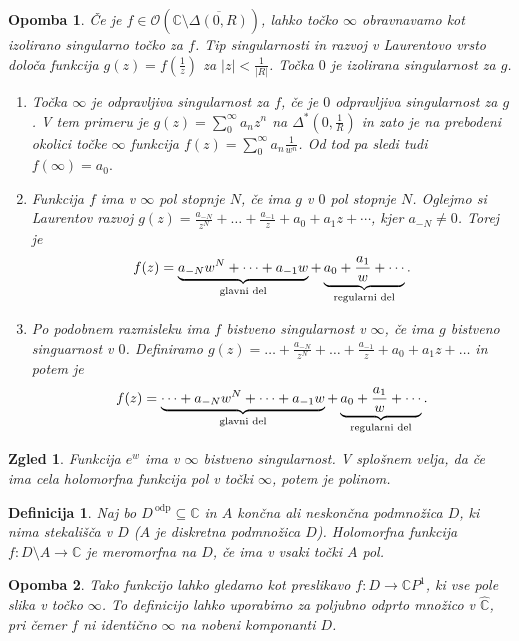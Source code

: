 \documentclass[10pt, a4paper]{article}
\newtheorem{defi}{Definicija}[section]
\newenvironment{noticeB}{%
  \tcolorbox[%
  notitle,
  empty,
  enhanced,  %
  breakable,
  coltext=black,
  colback=white, 
  fontupper=\rmfamily,
  parbox=false,
  noparskip,
  sharp corners,
  boxrule=-1pt,  %
  frame hidden,
  left=7pt,  %
  right=7pt,
  top=5pt,
  bottom=5pt,
  before skip=2.5ex plus 2pt,
  after skip=2.5ex plus 2pt,
  borderline west = {1.5pt}{-0.1pt}{blue!30!black}, %
  overlay unbroken and last={%
    \draw[color=black, line width=1.25pt]
    ($(frame.south west)+(1.pt, -0.1pt)$) -- ++(2em, 0);
  }
  ]}
{\endtcolorbox}
\newenvironment{definicija}{\begin{defi}\begin{noticeB}}{%
    \end{noticeB}\end{defi}}
\newtheorem*{opomba}{Opomba}
\newtheorem{zgled}{Zgled}[section]
\newcommand{\C}{\mathbb {C}}
\begin{document}
\begin{opomba}
  Če je $f \in \mathcal{O} (\C \setminus \overline{\Delta(0, R)})$, lahko točko $\infty$
  obravnavamo kot izolirano singularno točko za $f$. Tip singularnosti in 
  razvoj v Laurentovo vrsto določa funkcija $g(z) = f\left(\frac{1}{z}\right)$ za $|z| < \frac{1}{|R|}$.
  Točka $0$ je izolirana singularnost za $g$. 
  \begin{enumerate}
    \item Točka $\infty$ je odpravljiva singularnost za $f$, če je $0$ odpravljiva singularnost za $g$.
    V tem primeru je $g(z) = \sum_0 ^\infty a_{n} z^n$ na $\Delta^* \left(0, \frac{1}{R}\right)$
    in zato je na prebodeni okolici točke $\infty$ funkcija $f(z) = \sum_0 ^\infty a_n \frac{1}{w^n}$.
    Od tod pa sledi tudi $f(\infty) = a_0.$
    \item Funkcija $f$ ima v $\infty$ pol stopnje $N$, če ima $g$ v $0$
    pol stopnje $N$. Oglejmo si Laurentov razvoj $g(z) = \frac{a_{-N}}{z^N} + \dots + \frac{a_{-1}}{z} + a_0 + a_1 z + \cdots$,
    kjer $a_{-N} \neq 0$.
    Torej je $$f(z) = \underbrace{a_{-N}w^N + \dots + a_{-1} w}_{\textup{glavni del}} + \underbrace{a_0 + \frac{a_1}{w} + \cdots}_{\textup{regularni del}}.$$
    \item Po podobnem razmisleku ima $f$ bistveno singularnost v $\infty$, če ima $g$ bistveno singuarnost v $0$.
    Definiramo $g(z) = \dots + \frac{a_{-N}}{z^N} + \dots + \frac{a_{-1}}{z} + a_0 + a_1 z + \dots$
    in potem je 
    $$f(z) = \underbrace{\dots + a_{-N}w^N + \dots + a_{-1} w}_{\textup{glavni del}} + \underbrace{a_0 + \frac{a_1}{w} + \cdots}_{\textup{regularni del}}.$$
  \end{enumerate}
\end{opomba}

\begin{zgled}
  Funkcija $e^w$ ima v $\infty$ bistveno singularnost.
  V splošnem velja, da če ima cela holomorfna funkcija pol v točki $\infty$, potem
  je polinom.
\end{zgled}

\begin{definicija}
  Naj bo $D^{\ \text{odp}} \subseteq \C$ in $A$ končna ali neskončna podmnožica $D$, ki nima stekališča v $D$ 
  ($A$ je diskretna podmnožica $D$). Holomorfna funkcija $f: D\setminus A \to \C$ je meromorfna na $D$,
  če ima v vsaki točki $A$ pol.
\end{definicija}

\begin{opomba}
  Tako funkcijo lahko gledamo kot preslikavo $f: D \to \C P^1$, ki vse pole slika v točko $\infty$.
  To definicijo lahko uporabimo za poljubno odprto množico v $\widehat{\C}$,
  pri čemer $f$ ni identično $\infty$ na nobeni komponanti $D$. 
\end{opomba}
\end{document}
